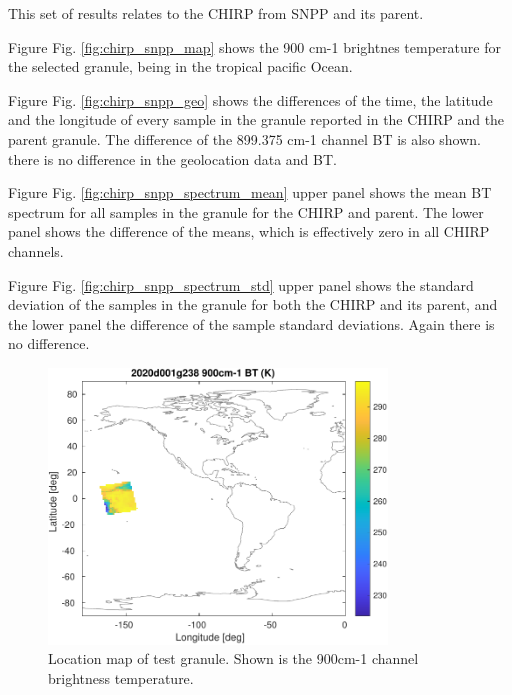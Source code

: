 \documentclass[11pt]{article}
\begin{document}
This set of results relates to the CHIRP from SNPP and its parent.

Figure Fig. \ref{fig:chirp_snpp_map} shows the 900 cm-1 brightnes temperature for the selected granule, being in the tropical pacific Ocean.

Figure Fig. \ref{fig:chirp_snpp_geo} shows the differences of the time, the latitude and the longitude of every sample in the granule  reported in the CHIRP and the parent granule. The difference of the 899.375 cm-1 channel BT is also shown. there is no difference in the geolocation data and BT.

Figure Fig. \ref{fig:chirp_snpp_spectrum_mean} upper panel shows the mean BT spectrum for all samples in the granule for the CHIRP and parent. The lower panel shows the difference of the means, which is effectively zero in all CHIRP channels.

Figure Fig. \ref{fig:chirp_snpp_spectrum_std} upper panel shows the standard deviation of the samples in the granule for both the CHIRP and its parent, and the lower panel the difference of the sample standard deviations. Again there is no difference.

\begin{figure}[htbp]
\centering
\includegraphics[angle=0,width=9cm]{./figs/2020d001g238_900cm_bt_map_snpp.pdf}
\caption{\label{fig:org6d8e7ff}
Location map of test granule. Shown is the 900cm-1 channel brightness temperature.}
\end{figure}
\end{document}
